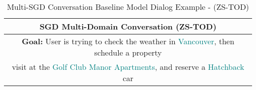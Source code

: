 \begin{table*}[ht]
\centering
\caption{Multi-SGD Conversation Baseline Model Dialog Example - (ZS-TOD)}
\label{tab:multi_sgd_results}
\begin{tabular}{p{15cm}}
\toprule
\multicolumn{1}{c}{\textbf{SGD Multi-Domain Conversation} (ZS-TOD)} \\
\midrule
\multicolumn{1}{c}{\textbf{Goal:} User is trying to check the weather in \textcolor{teal}{Vancouver}, then schedule a property} \\ \multicolumn{1}{c}{visit at the \textcolor{teal}{Golf Club Manor Apartments}, and reserve a \textcolor{teal}{Hatchback} car} \\
\midrule


\end{tabular}
\end{table*}
